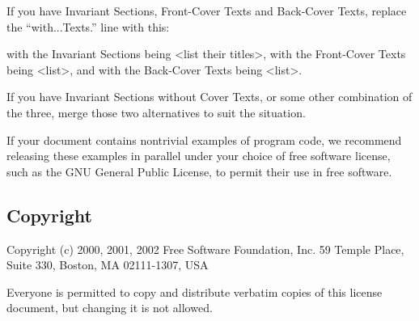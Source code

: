 If you have Invariant Sections, Front-Cover Texts and Back-Cover Texts,
replace the ``with...Texts.'' line with this:

with the Invariant Sections being <list their titles>, with the Front-Cover
Texts being <list>, and with the Back-Cover Texts being <list>.

If you have Invariant Sections without Cover Texts, or some other
combination of the three, merge those two alternatives to suit the
situation.

If your document contains nontrivial examples of program code, we
recommend releasing these examples in parallel under your choice of
free software license, such as the GNU General Public License, to
permit their use in free software.


\subsection{Copyright }

Copyright (c) 2000, 2001, 2002 Free Software Foundation, Inc. 59 Temple
Place, Suite 330, Boston, MA 02111-1307, USA

Everyone is permitted to copy and distribute verbatim copies of this
license document, but changing it is not allowed.

